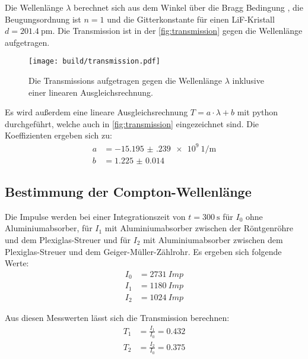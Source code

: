   \noindent Die Wellenlänge $\lambda $ berechnet sich aus dem Winkel über die Bragg Bedingung , die Beugungsordnung ist $n=1$ und die Gitterkonstante für einen 
  LiF-Kristall $d = \SI{201.4}{\pico\metre}$. Die Transmission ist in der \autoref{fig:transmission} gegen die Wellenlänge aufgetragen.

  \begin{figure}[H]
    \centering
    \texttt{[image: build/transmission.pdf]}
    \caption{Die Transmissions aufgetragen gegen die Wellenlänge $\lambda$ inklusive einer linearen Ausgleichsrechnung.}
    \label{fig:transmission}
  \end{figure}

  \noindent Es wird außerdem eine lineare Ausgleichsrechnung $T = a \cdot \lambda + b$ mit python durchgeführt, welche auch in \autoref{fig:transmission} eingezeichnet 
  sind. Die Koeffizienten ergeben sich zu:
  \begin{align*}
    a &= \SI{-15.195(239)e9}{1\per\metre}\\
    b &= \num{1.225(14)}
  \end{align*}


\subsection{Bestimmung der Compton-Wellenlänge} %

  Die Impulse werden bei einer Integrationszeit von $ t = \SI{300}{\second}$ für $I_0$ ohne Aluminiumabsorber, für $I_1$ mit Aluminiumabsorber zwischen der 
  Röntgenröhre und dem Plexiglas-Streuer und für $I_2$ mit Aluminiumabsorber zwischen dem Plexiglas-Streuer und dem Geiger-Müller-Zählrohr. 
  Es ergeben sich 
  folgende Werte:
  \begin{align*}
    I_0 &= \SI{2731}{Imp}\\
    I_1 &= \SI{1180}{Imp}\\
    I_2 &= \SI{1024}{Imp}
  \end{align*}

  \noindent Aus diesen Messwerten lässt sich die Transmission berechnen:
  \begin{align*}
    T_1 &= \frac{I_1}{I_0} = \num{0.432}\\
    T_2 &= \frac{I_2}{I_0} = \num{0.375}
  \end{align*}

